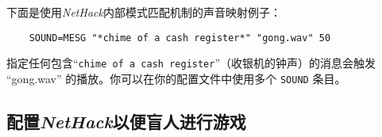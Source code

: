 \documentclass[a4paper, 10pt]{article}
\begin{document}
下面是使用{\it NetHack}内部模式匹配机制的声音映射例子：
\begin{verbatim}
    SOUND=MESG "*chime of a cash register*" "gong.wav" 50
\end{verbatim}
指定任何包含“{\tt chime of a cash register}”（收银机的钟声）的消息会触发
“gong.wav” 的播放。你可以在你的配置文件中使用多个 {\tt SOUND} 条目。

\subsection*{配置{\it NetHack}以便盲人进行游戏}
\end{document}
